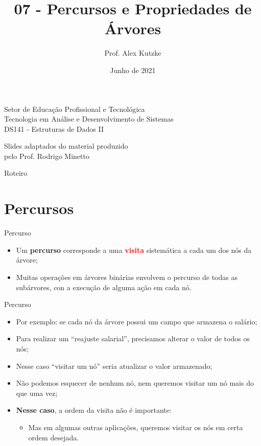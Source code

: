 \documentclass{beamer}
\title{07 - Percursos e Propriedades de Árvores}
\author{Prof. Alex Kutzke}
\date{Junho de 2021}
\newcommand{\tcr}[1]{\textcolor{red}{\textbf{#1}}}
\begin{document}
\begin{frame}
  \begin{center}
    \large{Setor de Educação Profissional e Tecnológica}\\
    Tecnologia em Análise e Desenvolvimento de Sistemas\\
    \vspace{1cm}			
    \small{DS141 - Estruturas de Dados II}
  \end{center}
  \titlepage

  \begin{center}
    Slides adaptados do material produzido\\pelo Prof. Rodrigo Minetto
  \end{center}
\end{frame}

\begin{frame}[c]{Roteiro}
  \tableofcontents

\end{frame}

\section{Percursos}

\begin{frame}[c]{Percurso}
  \begin{itemize}
    \item Um \textbf{percurso} corresponde a uma \tcr{visita} sistemática a cada um dos
      nós da árvore;
    \item Muitas operações em árvores binárias envolvem o percurso de todas as subárvores,
      con a execução de alguma ação em cada nó.
  \end{itemize}
\end{frame}

\begin{frame}[c]{Percurso}
  \begin{itemize}
    \item Por exemplo: se cada nó da árvore possui um campo que armazena o salário;
    \item Para realizar um ``reajuste salarial'', precisamos alterar o valor de todos os nós;
    \item Nesse caso ``visitar um nó'' seria atualizar o valor armazenado;
    \item Não podemos esquecer de nenhum nó, nem queremos visitar um nó mais do que uma vez;
    \item \textbf{Nesse caso}, a ordem da visita não é importante:
    \begin{itemize}
      \item Mas em algumas outras aplicações, queremos visitar os nós em certa ordem desejada.
    \end{itemize}
  \end{itemize}
\end{frame}
\end{document}
